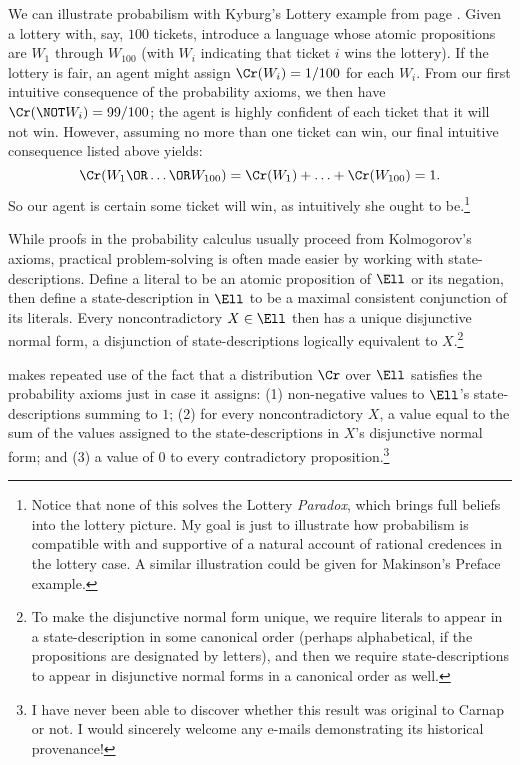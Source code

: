 We can illustrate probabilism with Kyburg's Lottery example from page \pageref{titelbaum-lottery}. Given a lottery with, say, $100$ tickets, introduce a language whose atomic propositions are $W_1$ through $W_{100}$ (with $W_i$ indicating that ticket $i$ wins the lottery). If the lottery is fair, an agent might assign $\Cr(W_i)=1/100$ for each $W_i$. From our first intuitive consequence of the probability axioms, we then have $\Cr(\NOT W_i)=99/100$; the agent is highly confident of each ticket that it will not win. However, assuming no more than one ticket can win, our final intuitive consequence listed above yields: 
\begin{equation}
\Cr(W_1 \OR \ldots \OR W_{100})= \Cr(W_1)+\ldots+\Cr(W_{100})=1.
\end{equation}
So our agent is certain some ticket will win, as intuitively she ought to be.\footnote
{Notice that none of this solves the Lottery \emph{Paradox}, which brings full beliefs into the lottery picture. My goal is just to illustrate how probabilism is compatible with and supportive of a natural account of rational credences in the lottery case. A similar illustration could be given for Makinson's Preface example.}

While proofs in the probability calculus usually proceed from Kolmogorov's axioms, practical problem-solving is often made easier by working with state-descriptions. Define a literal to be an atomic proposition of $\Ell$ or its negation, then define a state-description in $\Ell$ to be a maximal consistent conjunction of its literals. Every noncontradictory $X \in \Ell$ then has a unique disjunctive normal form, a disjunction of state-descriptions logically equivalent to $X$.\footnote
{To make the disjunctive normal form unique, we require literals to appear in a state-description in some canonical order (perhaps alphabetical, if the propositions are designated by letters), and then we require state-descriptions to appear in disjunctive normal forms in a canonical order as well.}

\citet{CarnapLogical} makes repeated use of the fact that a distribution $\Cr$ over $\Ell$ satisfies the probability axioms just in case it assigns: (1) non-negative values to $\Ell$'s state-descriptions summing to $1$; (2) for every noncontradictory $X$, a value equal to the sum of the values assigned to the state-descriptions in $X$'s disjunctive normal form; and (3) a value of $0$ to every contradictory proposition.\footnote
{I have never been able to discover whether this result was original to Carnap or not. I would sincerely welcome any e-mails demonstrating its historical provenance!}

